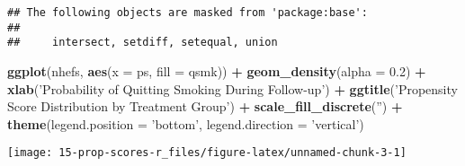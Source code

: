 \documentclass[10pt,]{book}
\newenvironment{Shaded}{\begin{snugshade}}{\end{snugshade}}
\newcommand{\DataTypeTok}[1]{\textcolor[rgb]{0.13,0.29,0.53}{#1}}
\newcommand{\FloatTok}[1]{\textcolor[rgb]{0.00,0.00,0.81}{#1}}
\newcommand{\KeywordTok}[1]{\textcolor[rgb]{0.13,0.29,0.53}{\textbf{#1}}}
\newcommand{\NormalTok}[1]{#1}
\newcommand{\OperatorTok}[1]{\textcolor[rgb]{0.81,0.36,0.00}{\textbf{#1}}}
\newcommand{\StringTok}[1]{\textcolor[rgb]{0.31,0.60,0.02}{#1}}
\begin{document}
\begin{verbatim}
## The following objects are masked from 'package:base':
## 
##     intersect, setdiff, setequal, union
\end{verbatim}

\begin{Shaded}
\begin{Highlighting}[]
\KeywordTok{ggplot}\NormalTok{(nhefs, }\KeywordTok{aes}\NormalTok{(}\DataTypeTok{x =}\NormalTok{ ps, }\DataTypeTok{fill =}\NormalTok{ qsmk)) }\OperatorTok{+}\StringTok{ }\KeywordTok{geom_density}\NormalTok{(}\DataTypeTok{alpha =} \FloatTok{0.2}\NormalTok{) }\OperatorTok{+}
\StringTok{  }\KeywordTok{xlab}\NormalTok{(}\StringTok{'Probability of Quitting Smoking During Follow-up'}\NormalTok{) }\OperatorTok{+}
\StringTok{  }\KeywordTok{ggtitle}\NormalTok{(}\StringTok{'Propensity Score Distribution by Treatment Group'}\NormalTok{) }\OperatorTok{+}
\StringTok{  }\KeywordTok{scale_fill_discrete}\NormalTok{(}\StringTok{''}\NormalTok{) }\OperatorTok{+}
\StringTok{  }\KeywordTok{theme}\NormalTok{(}\DataTypeTok{legend.position =} \StringTok{'bottom'}\NormalTok{, }\DataTypeTok{legend.direction =} \StringTok{'vertical'}\NormalTok{)}
\end{Highlighting}
\end{Shaded}

\begin{center}\texttt{[image: 15-prop-scores-r\_files/figure-latex/unnamed-chunk-3-1]} \end{center}
\end{document}
